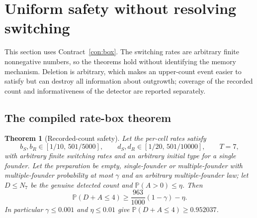 \documentclass[11pt,a4paper]{article}
\theoremstyle{plain}
\newtheorem{theorem}{Theorem}[section]
\theoremstyle{definition}
\theoremstyle{remark}
\newcommand{\PP}{\mathbb P}
\begin{document}
\section{Uniform safety without resolving switching}\label{sec:safety}

This section uses Contract~\ref{con:box}. The switching rates are arbitrary finite nonnegative numbers, so the theorems hold without identifying the memory mechanism. Deletion is arbitrary, which makes an upper-count event easier to satisfy but can destroy all information about outgrowth; coverage of the recorded count and informativeness of the detector are reported separately.

\subsection{The compiled rate-box theorem}
\begin{theorem}[Recorded-count safety]\label{thm:ratebox}
Let the per-cell rates satisfy
\begin{equation}\label{eq:box}
b_S,b_R\in[1/10,\,501/5000],\qquad d_S,d_R\in[1/20,\,501/10000],\qquad T=7,
\end{equation}
with arbitrary finite switching rates and an arbitrary initial type for a single founder. Let the preparation be empty, single-founder or multiple-founder with multiple-founder probability at most $\gamma$ and an arbitrary multiple-founder law; let $D\le N_7$ be the genuine detected count and $\PP(A>0)\le\eta$. Then
\begin{equation}\label{eq:ratebox}
\PP(D+A\le4)\ge\frac{963}{1000}(1-\gamma)-\eta .
\end{equation}
In particular $\gamma\le0.001$ and $\eta\le0.01$ give $\PP(D+A\le4)\ge0.952037$.
\end{theorem}
\end{document}
